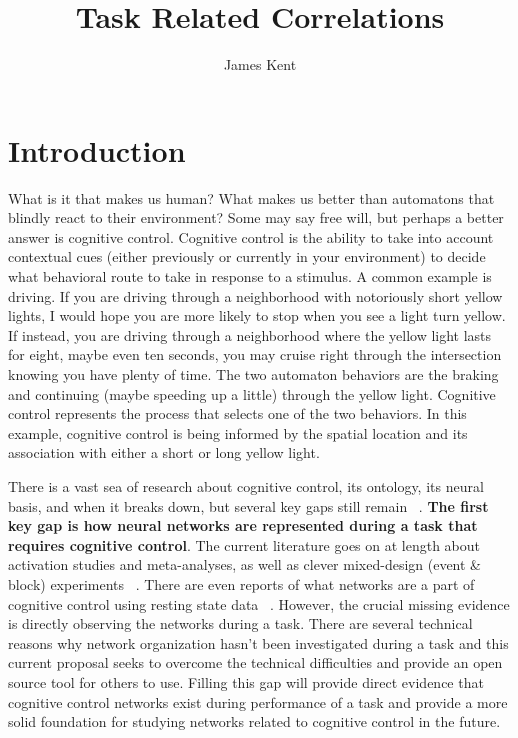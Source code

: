 \documentclass[phd,appendix,figures]{uithesis}
\title{Task Related Correlations}
\author{James Kent}
\begin{document}
\frontmatter

\chapter{Introduction}
What is it that makes us human? 
What makes us better than automatons that blindly react to their environment?
Some may say free will, but perhaps a better answer is cognitive control.
Cognitive control is the ability to take into account contextual cues (either previously or currently in your environment) to decide what behavioral route to take in response to a stimulus. 
A common example is driving.
If you are driving through a neighborhood with notoriously short yellow lights, I would hope you are more likely to stop when you see a light turn yellow.
If instead, you are driving through a neighborhood where the yellow light lasts for eight, maybe even ten seconds, you may cruise right through the intersection knowing you have plenty of time.
The two automaton behaviors are the braking and continuing (maybe speeding up a little) through the yellow light.
Cognitive control represents the process that selects one of the two behaviors.
In this example, cognitive control is being informed by the spatial location and its association with either a short or long yellow light.

There is a vast sea of research about cognitive control, its ontology, its neural basis, and when it breaks down, but several key gaps still remain ~\citep{Gratton2017,Dosenbach2010,Braver2000}.
\textbf{The first key gap is how neural networks are represented during a task that requires cognitive control}.
The current literature goes on at length about activation studies and meta-analyses, as well as clever mixed-design (event \& block) experiments ~\citep{Gratton2017a,Lerman-Sinkoff2017,Herd2006,Rizio2012,Cooper2015,AppelBaum2014}.
There are even reports of what networks are a part of cognitive control using resting state data ~\citep{Dosenbach2007}.
However, the crucial missing evidence is directly observing the networks during a task.
There are several technical reasons why network organization hasn't been investigated during a task and this current proposal seeks to overcome the technical difficulties and provide an open source tool for others to use.
Filling this gap will provide direct evidence that cognitive control networks exist during performance of a task and provide a more solid foundation for studying networks related to cognitive control in the future.
\end{document}
